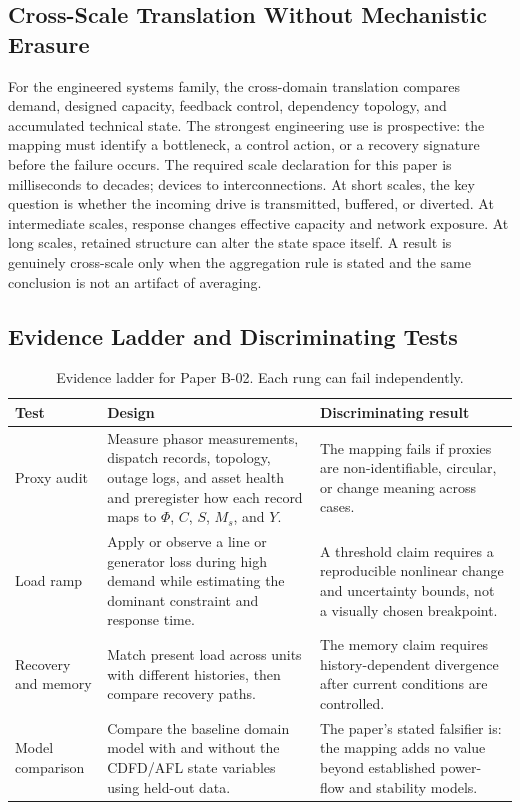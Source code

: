 \documentclass[11pt,a4paper]{article}
\begin{document}
\subsection{Cross-Scale Translation Without Mechanistic Erasure}

For the engineered systems family, the cross-domain translation compares demand, designed capacity, feedback control, dependency topology, and accumulated technical state. The strongest engineering use is prospective: the mapping must identify a bottleneck, a control action, or a recovery signature before the failure occurs. \cite{BarabasiAlbert1999,WattsStrogatz1998,Shannon1948,BakTangWiesenfeld1987}
The required scale declaration for this paper is milliseconds to decades; devices to interconnections. At short
scales, the key question is whether the incoming drive is transmitted,
buffered, or diverted. At intermediate scales, response changes effective
capacity and network exposure. At long scales, retained structure can alter the
state space itself. A result is genuinely cross-scale only when the aggregation
rule is stated and the same conclusion is not an artifact of averaging.

\subsection{Evidence Ladder and Discriminating Tests}

\begin{table}[htbp]
\centering
\small
\caption{Evidence ladder for Paper B-02. Each rung can fail independently.}
\begin{tabularx}{\textwidth}{|p{}|X|X|}
\hline
\textbf{Test} & \textbf{Design} & \textbf{Discriminating result} \\
\hline
Proxy audit & Measure phasor measurements, dispatch records, topology, outage logs, and asset health and preregister how each record maps to $\Phi$, $C$, $S$, $M_s$, and $Y$. & The mapping fails if proxies are non-identifiable, circular, or change meaning across cases. \\
\hline
Load ramp & Apply or observe a line or generator loss during high demand while estimating the dominant constraint and response time. & A threshold claim requires a reproducible nonlinear change and uncertainty bounds, not a visually chosen breakpoint. \\
\hline
Recovery and memory & Match present load across units with different histories, then compare recovery paths. & The memory claim requires history-dependent divergence after current conditions are controlled. \\
\hline
Model comparison & Compare the baseline domain model with and without the CDFD/AFL state variables using held-out data. & The paper's stated falsifier is: the mapping adds no value beyond established power-flow and stability models. \\
\hline
\end{tabularx}
\end{table}
\end{document}
